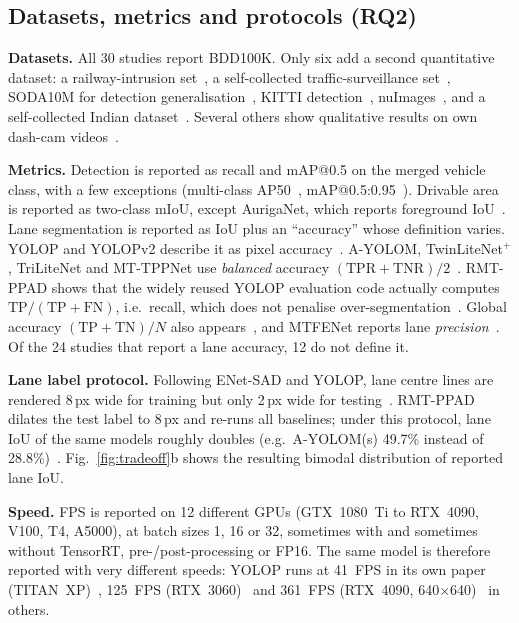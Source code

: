 \documentclass[journal,onecolumn]{IEEEtran}
\begin{document}
\subsection{Datasets, metrics and protocols (RQ2)}
\textbf{Datasets.} All 30 studies report BDD100K. Only six add a second quantitative dataset: a railway-intrusion set~\cite{mttppnet2025}, a self-collected traffic-surveillance set~\cite{li2023multinetgs}, SODA10M for detection generalisation~\cite{mtfenet2025}, KITTI detection~\cite{liu2024fusion}, nuImages~\cite{liang2023veprompt}, and a self-collected Indian dataset~\cite{selvarajan2026safety}. Several others show qualitative results on own dash-cam videos~\cite{wang2024ayolom,wang2026rmtppad}.

\textbf{Metrics.} Detection is reported as recall and mAP@0.5 on the merged vehicle class, with a few exceptions (multi-class AP50~\cite{liang2023veprompt}, mAP@0.5:0.95~\cite{ghasemzadeh2026auriganet}). Drivable area is reported as two-class mIoU, except AurigaNet, which reports foreground IoU~\cite{ghasemzadeh2026auriganet}. Lane segmentation is reported as IoU plus an ``accuracy'' whose definition varies. YOLOP and YOLOPv2 describe it as pixel accuracy~\cite{wu2022yolop,han2022yolopv2}. A-YOLOM, TwinLiteNet$^+$, TriLiteNet and MT-TPPNet use \emph{balanced} accuracy $(\mathrm{TPR}+\mathrm{TNR})/2$~\cite{wang2024ayolom,che2025twinliteplus,trilitenet2025,mttppnet2025}. RMT-PPAD shows that the widely reused YOLOP evaluation code actually computes $\mathrm{TP}/(\mathrm{TP}+\mathrm{FN})$, i.e.\ recall, which does not penalise over-segmentation~\cite{wang2026rmtppad}. Global accuracy $(\mathrm{TP}+\mathrm{TN})/N$ also appears~\cite{lin2024tyolop,ghasemzadeh2026auriganet}, and MTFENet reports lane \emph{precision}~\cite{mtfenet2025}. Of the 24 studies that report a lane accuracy, 12 do not define it.

\textbf{Lane label protocol.} Following ENet-SAD and YOLOP, lane centre lines are rendered 8\,px wide for training but only 2\,px wide for testing~\cite{wu2022yolop}. RMT-PPAD dilates the test label to 8\,px and re-runs all baselines; under this protocol, lane IoU of the same models roughly doubles (e.g.\ A-YOLOM(s) 49.7\% instead of 28.8\%)~\cite{wang2026rmtppad}. Fig.~\ref{fig:tradeoff}b shows the resulting bimodal distribution of reported lane IoU.

\textbf{Speed.} FPS is reported on 12 different GPUs (GTX~1080~Ti to RTX~4090, V100, T4, A5000), at batch sizes 1, 16 or 32, sometimes with and sometimes without TensorRT, pre-/post-processing or FP16. The same model is therefore reported with very different speeds: YOLOP runs at 41~FPS in its own paper (TITAN~XP)~\cite{wu2022yolop}, 125~FPS (RTX~3060)~\cite{tang2024yolopdn} and 361~FPS (RTX~4090, 640$\times$640)~\cite{mtfenet2025} in others.
\end{document}
